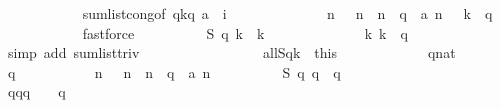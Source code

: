\begin{isabellebody}
\ \ \ \ \ \ \ \ \ \ \isamarkupfalse%
\ sum{\isacharunderscore}list{\isacharunderscore}cong{\isacharbrackleft}of\ {\isachardoublequoteopen}{\isacharbrackleft}q{\isacharminus}k{\isachardot}{\isachardot}{\isacharless}q{\isacharbrackright}{\isachardoublequoteclose}\ a\ {\isachardoublequoteopen}{\isasymlambda}\ i{\isachardot}\ {}{\isachardoublequoteclose}{\isacharbrackright}\isanewline
\ \ \ \ \ \ \ \ \ \ \isamarkupfalse%
\ {\isacharbackquoteopen}{\isasymforall}\ n{\isachardot}\ {}\ {\isasymle}\ n\ {\isasymand}\ n\ {\isacharless}\ q\ {\isasymlongrightarrow}\ a\ n\ {\isacharequal}\ {}{\isacharbackquoteclose}\ {\isacharbackquoteopen}k\ {\isacharless}\ q{\isacharbackquoteclose}\isanewline
\ \ \ \ \ \ \ \ \ \ \isamarkupfalse%
\ fastforce\isanewline
\ \ \ \ \ \ \ \ \isamarkupfalse%
\ {\isachardoublequoteopen}{\isacharquery}S\ q\ k\ {\isacharequal}\ k{\isachardoublequoteclose}\isanewline
\ \ \ \ \ \ \ \ \ \ \isamarkupfalse%
\ {\isacharbackquoteopen}{}\ {\isasymle}\ k{\isacharbackquoteclose}\ {\isacharbackquoteopen}k\ {\isacharless}\ q{\isacharbackquoteclose}\isanewline
\ \ \ \ \ \ \ \ \ \ \isamarkupfalse%
\ {\isacharparenleft}simp\ add{\isacharcolon}\ sum{\isacharunderscore}list{\isacharunderscore}triv{\isacharparenright}\isanewline
\ \ \ \ \ \ \isamarkupfalse%
\isanewline
\ \ \ \ \isacommand{{\isacharbraceright}}\isamarkupfalse%
\isanewline
\ \ \ \ \isamarkupfalse%
\ all{\isacharunderscore}{}{\isacharunderscore}Sqk\ {\isacharequal}\ this\isanewline
\isanewline
\ \ \ \ \isacommand{{\isacharbraceleft}}\isamarkupfalse%
\isanewline
\ \ \ \ \ \ \isamarkupfalse%
\ q{\isacharcolon}{\isacharcolon}nat\isanewline
\ \ \ \ \ \ \isamarkupfalse%
\ {\isachardoublequoteopen}q\ {\isasymge}\ {}{\isachardoublequoteclose}\isanewline
\ \ \ \ \ \ \isamarkupfalse%
\ {\isachardoublequoteopen}{\isasymforall}\ n{\isachardot}\ {}\ {\isasymle}\ n\ {\isasymand}\ n\ {\isacharless}\ q\ {\isasymlongrightarrow}\ a\ n\ {\isacharequal}\ {}{\isachardoublequoteclose}\isanewline
\ \ \ \ \ \ \isamarkupfalse%
\ {\isachardoublequoteopen}{\isacharquery}S\ q\ q\ {\isacharequal}\ q\ {\isacharminus}\ {}{\isachardoublequoteclose}\isanewline
\ \ \ \ \ \ \isamarkupfalse%
{\isacharminus}\isanewline
\ \ \ \ \ \ \ \ \isamarkupfalse%
\ {\isachardoublequoteopen}{\isacharbrackleft}q{\isacharminus}q{\isachardot}{\isachardot}{\isacharless}q{\isacharbrackright}\ {\isacharequal}\ {\isacharbrackleft}{}{\isacharbrackright}\ {\isacharat}\ {\isacharbrackleft}{}{\isachardot}{\isachardot}{\isacharless}q{\isacharbrackright}{\isachardoublequoteclose}\isanewline

\end{isabellebody}
